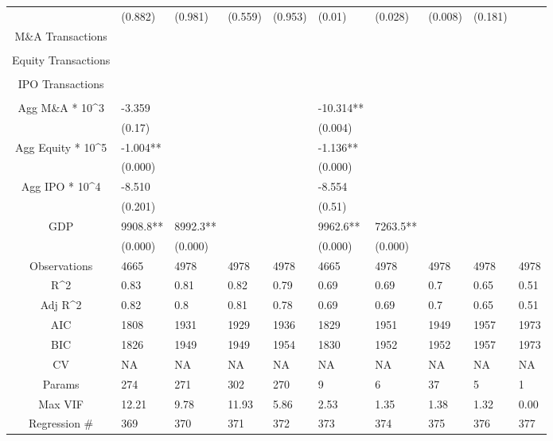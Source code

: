 \documentclass{article}
\begin{document}
\begin{table}[H]
\begin{tabular}{|clllllllll|}
   & (0.882) & (0.981) & (0.559) & (0.953) & (0.01) & (0.028) & (0.008) & (0.181) &  \\ 
  M\&A Transactions &  &  &  &  &  &  &  &  &  \\ 
   &  &  &  &  &  &  &  &  &  \\ 
  Equity Transactions &  &  &  &  &  &  &  &  &  \\ 
   &  &  &  &  &  &  &  &  &  \\ 
  IPO Transactions &  &  &  &  &  &  &  &  &  \\ 
   &  &  &  &  &  &  &  &  &  \\ 
  Agg M\&A * 10^3 & -3.359 &  &  &  & -10.314** &  &  &  &  \\ 
   & (0.17) &  &  &  & (0.004) &  &  &  &  \\ 
  Agg Equity * 10^5 & -1.004** &  &  &  & -1.136** &  &  &  &  \\ 
   & (0.000) &  &  &  & (0.000) &  &  &  &  \\ 
  Agg IPO * 10^4 & -8.510 &  &  &  & -8.554 &  &  &  &  \\ 
   & (0.201) &  &  &  & (0.51) &  &  &  &  \\ 
  GDP & 9908.8** & 8992.3** &  &  & 9962.6** & 7263.5** &  &  &  \\ 
   & (0.000) & (0.000) &  &  & (0.000) & (0.000) &  &  &  \\ 
  \hline 
 Observations & 4665 & 4978 & 4978 & 4978 & 4665 & 4978 & 4978 & 4978 & 4978 \\ 
  R^2 & 0.83 & 0.81 & 0.82 & 0.79 & 0.69 & 0.69 & 0.7 & 0.65 & 0.51 \\ 
  Adj R^2 & 0.82 & 0.8 & 0.81 & 0.78 & 0.69 & 0.69 & 0.7 & 0.65 & 0.51 \\ 
  AIC & 1808 & 1931 & 1929 & 1936 & 1829 & 1951 & 1949 & 1957 & 1973 \\ 
  BIC & 1826 & 1949 & 1949 & 1954 & 1830 & 1952 & 1952 & 1957 & 1973 \\ 
  CV & NA & NA & NA & NA & NA & NA & NA & NA & NA \\ 
  Params & 274 & 271 & 302 & 270 & 9 & 6 & 37 & 5 & 1 \\ 
  Max VIF & 12.21 & 9.78 & 11.93 & 5.86 & 2.53 & 1.35 & 1.38 & 1.32 & 0.00 \\ 
  Regression \# & 369 & 370 & 371 & 372 & 373 & 374 & 375 & 376 & 377 \\ 
   \hline
\end{tabular}
 
\end{table}
\end{document}
